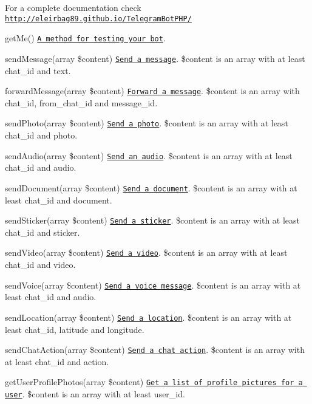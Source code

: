 For a complete documentation check \href{http://eleirbag89.github.io/TelegramBotPHP/}{\tt http\+://eleirbag89.\+github.\+io/\+Telegram\+Bot\+P\+H\+P/}
\begin{DoxyItemize}
\item get\+Me() \href{https://core.telegram.org/bots/api#getme}{\tt A method for testing your bot}.
\item send\+Message(array \$content) \href{https://core.telegram.org/bots/api#sendmessage}{\tt Send a message}. \$content is an array with at least chat\+\_\+id and text.
\item forward\+Message(array \$content) \href{https://core.telegram.org/bots/api#forwardmessage}{\tt Forward a message}. \$content is an array with chat\+\_\+id, from\+\_\+chat\+\_\+id and message\+\_\+id.
\item send\+Photo(array \$content) \href{https://core.telegram.org/bots/api#sendphoto}{\tt Send a photo}. \$content is an array with at least chat\+\_\+id and photo.
\item send\+Audio(array \$content) \href{https://core.telegram.org/bots/api#sendaudio}{\tt Send an audio}. \$content is an array with at least chat\+\_\+id and audio.
\item send\+Document(array \$content) \href{https://core.telegram.org/bots/api#senddocument}{\tt Send a document}. \$content is an array with at least chat\+\_\+id and document.
\item send\+Sticker(array \$content) \href{https://core.telegram.org/bots/api#sendsticker}{\tt Send a sticker}. \$content is an array with at least chat\+\_\+id and sticker.
\item send\+Video(array \$content) \href{https://core.telegram.org/bots/api#sendvideo}{\tt Send a video}. \$content is an array with at least chat\+\_\+id and video.
\item send\+Voice(array \$content) \href{https://core.telegram.org/bots/api#sendvoice}{\tt Send a voice message}. \$content is an array with at least chat\+\_\+id and audio.
\item send\+Location(array \$content) \href{https://core.telegram.org/bots/api#sendlocation}{\tt Send a location}. \$content is an array with at least chat\+\_\+id, latitude and longitude.
\item send\+Chat\+Action(array \$content) \href{https://core.telegram.org/bots/api#sendchataction}{\tt Send a chat action}. \$content is an array with at least chat\+\_\+id and action.
\item get\+User\+Profile\+Photos(array \$content) \href{https://core.telegram.org/bots/api#getuserprofilephotos}{\tt Get a list of profile pictures for a user}. \$content is an array with at least user\+\_\+id.

\end{DoxyItemize}
